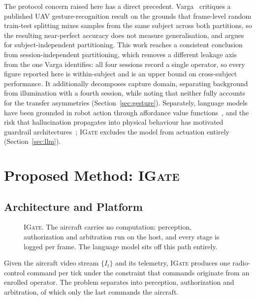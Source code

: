 \documentclass[conference]{IEEEtran}
\newcommand{\method}[1]{\textsc{#1}}
\begin{document}
The protocol concern raised here has a direct precedent. Varga~\cite{varga2026}
critiques a published UAV gesture-recognition result on the grounds that
frame-level random train-test splitting mixes samples from the same subject
across both partitions, so the resulting near-perfect accuracy does not measure
generalisation, and argues for subject-independent partitioning. This work
reaches a consistent conclusion from session-independent partitioning, which
removes a different leakage axis from the one Varga identifies: all four sessions
record a single operator, so every figure reported here is within-subject and is
an upper bound on cross-subject performance. It additionally decomposes capture
domain, separating background from illumination
with a fourth session, while noting that neither fully accounts for the transfer
asymmetries (Section~\ref{sec:gesture}). Separately, language models have been grounded in
robot action through affordance value functions~\cite{ahn2022saycan}, and the
risk that hallucination propagates into physical behaviour has motivated
guardrail architectures~\cite{ravichandran2025}; \method{IGate} excludes the
model from actuation entirely (Section~\ref{sec:llm}).



\section{Proposed Method: \method{IGate}}
\label{sec:system}

\subsection{Architecture and Platform}
\label{sec:arch}

\begin{figure}[t]
\centering
\resizebox{\textwidth}{!}{}
\caption{\method{IGate}. The aircraft carries no computation: perception,
authorization and arbitration run on the host, and every stage is logged per
frame. The language model sits off this path entirely.}
\label{fig:arch}
\end{figure}

Given the aircraft video stream $\{I_t\}$ and its telemetry, \method{IGate}
produces one radio-control command per tick under the constraint that commands
originate from an enrolled operator. The problem separates into perception,
authorization and arbitration, of which only the last commands the aircraft.
\end{document}
